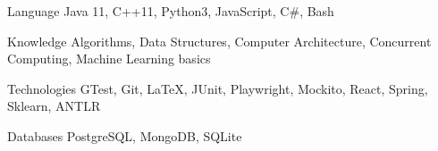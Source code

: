 

\begin{cvskills}

  \cvskill
    {Language} %
    {Java 11, C++11, Python3, JavaScript, C\#, Bash} %

  \cvskill
    {Knowledge} %
    {Algorithms, Data Structures, Computer Architecture, Concurrent Computing, Machine Learning basics} %

  \cvskill
    {Technologies} %
    {GTest, Git, \LaTeX, JUnit, Playwright, Mockito, React, Spring, Sklearn, ANTLR} %

  \cvskill
    {Databases} %
    {PostgreSQL, MongoDB, SQLite} %

\end{cvskills}
